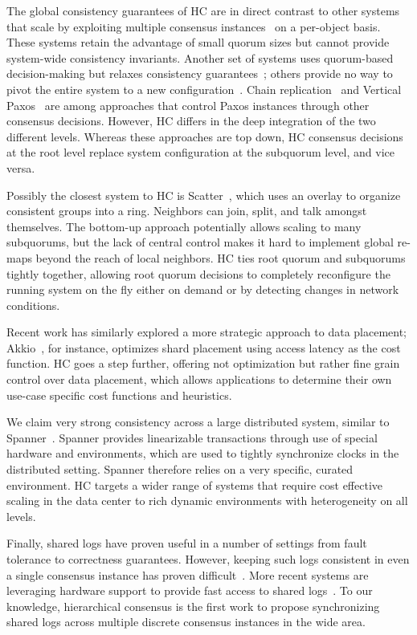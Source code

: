\documentclass[10pt,conference]{IEEEtran}
\newcommand{\hc}{hierarchical consensus\xspace}
\newcommand{\sub}{subquorum\xspace}
\newcommand{\subs}{subquorums\xspace}
\newcommand{\roo}{root quorum\xspace}
\begin{document}
The global consistency guarantees of HC are in direct contrast to other
systems that scale by exploiting multiple consensus
instances~\cite{mdcc,spanner} on a per-object basis.
These systems retain the advantage of small quorum sizes but cannot provide
system-wide consistency invariants.
Another set of systems uses quorum-based decision-making but relaxes
consistency guarantees~\cite{dynamo,pnuts}; others provide no way to
pivot the entire system to a new configuration~\cite{scatter}.
Chain replication~\cite{chain_replication} and Vertical Paxos~\cite{vertical_paxos,niobe}
are among approaches that control Paxos instances through other consensus decisions.
However, HC differs in the deep integration of the two different levels.
Whereas these approaches are top down, HC consensus decisions at the root
level replace system configuration at the \sub level, and vice versa.

Possibly the closest system to HC is Scatter~\cite{scatter}, which uses an
overlay to organize consistent groups into a ring.
Neighbors can join, split, and talk amongst themselves.
The bottom-up approach potentially allows scaling to many
\subs, but the lack of central control makes it hard to implement global
re-maps beyond the reach of local neighbors.
HC ties \roo and \subs tightly together, allowing \roo decisions to
completely reconfigure the running system on the fly either on demand or
by detecting changes in network conditions.

Recent work has similarly explored a more strategic approach to data placement;
Akkio~\cite{akkio}, for instance, optimizes shard placement using access
latency as the cost function.
HC goes a step further, offering not optimization but rather fine grain control
over data placement, which allows applications to determine their own
use-case specific cost functions and heuristics.

We claim very strong consistency across a large distributed system, similar
to Spanner~\cite{spanner}.
Spanner provides linearizable  transactions through use of special hardware
and environments, which are used to tightly synchronize clocks in the
distributed setting.
Spanner therefore relies on a very specific, curated environment.
HC targets a wider range of systems that require cost effective scaling in
the data center to rich dynamic environments with heterogeneity on all levels.

Finally, shared logs have proven useful in a number of settings from fault
tolerance to correctness guarantees.
However, keeping such logs consistent in even a single consensus instance has
proven difficult~\cite{chubby,zookeeper}.
More recent systems are leveraging hardware support to provide fast access to
shared logs~\cite{vcorfu,tango,fawn}.
To our knowledge, \hc is the first work to propose synchronizing shared logs
across multiple discrete consensus instances in the wide area.
\end{document}
